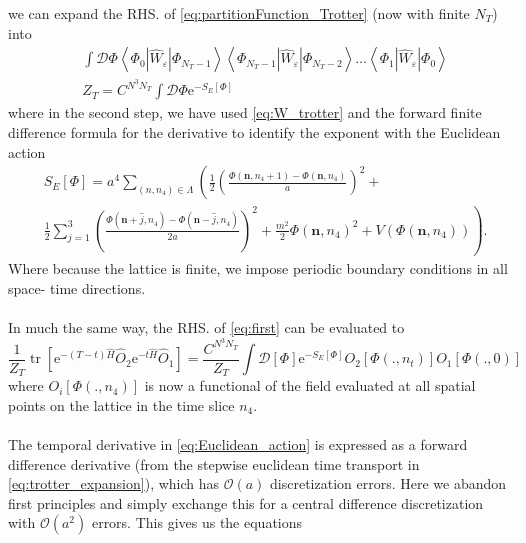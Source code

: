 \documentclass[a4paper,10pt]{book}
\begin{document}
we can expand the RHS. of \eqref{eq:partitionFunction_Trotter} (now with finite $N_T$) into 
\begin{equation}\label{eq:trotter_expansion}
\begin{aligned}
&\int \mathcal{D} \Phi \left\langle\Phi_0\left|\widehat{W}_{\varepsilon}\right| \Phi_{N_{T}-1}\right\rangle\left\langle\Phi_{N_{T}-1}\left|\widehat{W}_{\varepsilon}\right| \Phi_{N_{T}-2}\right\rangle \ldots\left\langle\Phi_{1}\left|\widehat{W}_{\varepsilon}\right| \Phi_{0}\right\rangle \\
&Z_T=C^{N^{3} N_{T}} \int \mathcal{D} \Phi  \mathrm{e}^{-S_{E}[\Phi]}
\end{aligned}
\end{equation}
where in the second step, we have used \eqref{eq:W_trotter} and the forward finite difference formula for the derivative to identify the exponent with the Euclidean action
\begin{equation}\label{eq:Euclidean_action}
\begin{aligned}
&S_{E}[\Phi]= a^{4} \sum_{\left(n, n_{4}\right) \in \Lambda}\left(\frac{1}{2}\left(\frac{\Phi\left(\boldsymbol{n}, n_{4}+1\right)-\Phi\left(\boldsymbol{n}, n_{4}\right)}{a}\right)^{2}+\right. \\
&\left.\frac{1}{2} \sum_{j=1}^{3}\left(\frac{\Phi\left(\boldsymbol{n}+\hat{j}, n_{4}\right)-\Phi\left(\boldsymbol{n}-\hat{j}, n_{4}\right)}{2 a}\right)^{2}+\frac{m^{2}}{2} \Phi\left(\boldsymbol{n}, n_{4}\right)^{2}+V\left(\Phi\left(\boldsymbol{n}, n_{4}\right)\right)\right).
\end{aligned}
\end{equation}
Where because the lattice is finite, we impose periodic boundary conditions in all space- time directions.\\\\ In much the same way, the RHS. of \eqref{eq:first} can be evaluated to
\begin{equation}
\frac{1}{Z_{T}} \operatorname{tr}\left[\mathrm{e}^{-(T-t) \hat{H}} \widehat{O}_{2} \mathrm{e}^{-t \hat{H}} \widehat{O}_{1}\right]=\frac{C^{N^{3} N_{T}}}{Z_{T}} \int \mathcal{D}[\Phi] \mathrm{e}^{-S_{E}[\Phi]} O_{2}\left[\Phi\left(., n_{t}\right)\right] O_{1}[\Phi(., 0)]
\end{equation}
where $O_{i}[\Phi(., n_4)]$ is now a functional of the field evaluated at all spatial points on the lattice in the time slice $n_4$.\\\\The temporal derivative in \eqref{eq:Euclidean_action} is expressed as a forward difference derivative (from the stepwise euclidean time transport in \eqref{eq:trotter_expansion}), which has $\mathcal{O}(a)$ discretization errors. Here we abandon first principles and simply exchange this for a central difference discretization with $\mathcal{O}(a^2)$ errors. This gives us the equations 
\end{document}
